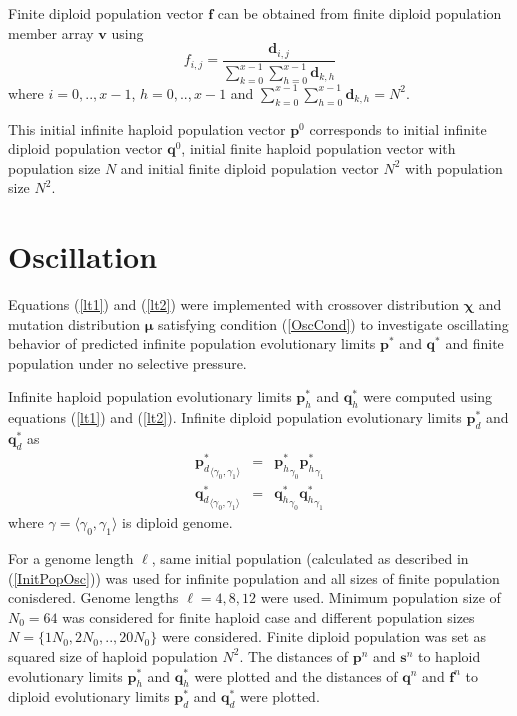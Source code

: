 Finite diploid population vector $\bm{f}$ can be obtained from finite diploid population member array $\bm{v}$  using
\[
f_{i,j} = \frac{\bm{d}_{i,j}}{\sum \limits_{k=0}^{x-1} \sum \limits_{h=0}^{x-1} \bm{d}_{k,h}}
\]
where $i = 0,.., x-1$, $h = 0,.., x-1$ and $\sum \limits_{k=0}^{x-1} \sum \limits_{h=0}^{x-1} \bm{d}_{k,h} = N^2$.

This initial infinite haploid population vector $\bm{p}^0$ corresponds to initial infinite diploid population vector $\bm{q}^0$, initial finite 
haploid population vector with population size $N$ and initial finite diploid population vector $N^2$ with population size $N^2$.

\section{Oscillation}
\label{Oscillation}

Equations (\ref{lt1}) and (\ref{lt2}) were implemented with crossover distribution $\bm{\chi}$ and mutation distribution $\bm{\mu}$ satisfying 
condition (\ref{OscCond}) to investigate oscillating behavior of predicted infinite population evolutionary limits $\bm{p}^{\ast}$ and $\bm{q}^{\ast}$ 
and finite population under no selective pressure.

Infinite haploid population evolutionary limits $\bm{p}_h^{\ast}$ and $\bm{q}_h^{\ast}$ were computed using equations (\ref{lt1}) and (\ref{lt2}). 
Infinite diploid population evolutionary limits $\bm{p}_d^{\ast}$ and $\bm{q}_d^{\ast}$ as
\begin{eqnarray*}
{\bm{p}_d^{\ast}}_{\langle \gamma_0, \gamma_1 \rangle} & = & {\bm{p}_h^{\ast}}_{\gamma_0} {\bm{p}_h^{\ast}}_{\gamma_1} \\
{\bm{q}_d^{\ast}}_{\langle \gamma_0, \gamma_1 \rangle} & = & {\bm{q}_h^{\ast}}_{\gamma_0} {\bm{q}_h^{\ast}}_{\gamma_1}
\end{eqnarray*}
where $\gamma = \langle \gamma_0, \gamma_1 \rangle$ is diploid genome.

For a genome length $\ell$, same initial population (calculated as described in (\ref{InitPopOsc})) was used for infinite population and all 
sizes of finite population conisdered.
Genome lengths $\ell = {4, 8, 12}$ were used. Minimum population size of $N_0 = 64$ was considered for finite haploid case and 
different population sizes $N = \{1N_0, 2N_0,.., 20N_0\}$ were considered. Finite diploid population was set as squared size of haploid 
population $N^2$.
The distances of $\bm{p}^n$ and $\bm{s}^n$ to haploid evolutionary limits $\bm{p}_h^{\ast}$ and $\bm{q}_h^{\ast}$ were plotted and the distances of $\bm{q}^n$ and 
$\bm{f}^n$ to diploid evolutionary limits $\bm{p}_d^{\ast}$ and $\bm{q}_d^{\ast}$ were plotted.

